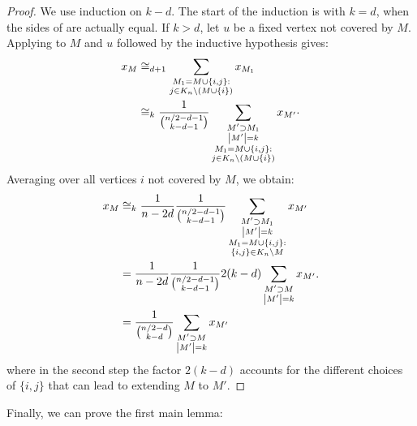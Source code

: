 \begin{proof}
We use induction on \(k - d\).
The start of the induction is with \(k = d\),
when the sides of 
are actually equal. If \(k > d\), let \(u\) be a fixed vertex not covered by \(M\).
Applying  to \(M\) and \(u\)
followed by the inductive hypothesis gives:
\begin{equation*}
	\begin{split}
    x_{M}
    &\cong_{d+1}
    \sum_{\substack{M_{1} = M \cup \{i,j\}: \\
        j \in K_{n} \setminus (M \cup \{i\})}}
    x_{M_{1}} \\
    &\cong_k
    \frac{1}{\binom{n/2 - d - 1}{k - d - 1}}
    \sum_{\substack{
        M' \supset M_{1} \\ \left|M'\right| = k \\
        M_{1} = M \cup \{i,j\}: \\
        j \in K_{n} \setminus (M \cup \{i\})}}
    x_{M'}
    \end{split}
    .
\end{equation*}
Averaging over all vertices \(i\) not covered by \(M\),
we obtain:
\begin{equation*}
  \begin{split}
  x_{M}
  &\cong_k
  \frac{1}{n - 2 d}
  \frac{1}{\binom{n/2 - d - 1}{k - d - 1}}
  \sum_{\substack{
      M' \supset M_{1} \\ \left|M'\right| = k \\
      M_{1} = M \cup \{i,j\}: \\
      \{i,j\} \in K_{n} \setminus M}}
  x_{M'} \\
  &=
  \frac{1}{n - 2 d}
  \frac{1}{\binom{n/2 - d - 1}{k - d - 1}}
  2 (k - d)
  \sum_{\substack{
      M' \supset M \\ \left|M'\right| = k}}
  x_{M'} \\
  &=
  \frac{1}{\binom{n/2 - d}{k - d}}
  \sum_{\substack{M' \supset M \\ \left|M'\right| = k}}
  x_{M'}
  \end{split}
  .
\end{equation*}
where in the second step the factor \(2(k - d)\) accounts for the different choices of $\{i,j\}$ that can lead to extending $M$ to $M'$.
\end{proof}
Finally, we can prove the first main lemma:

